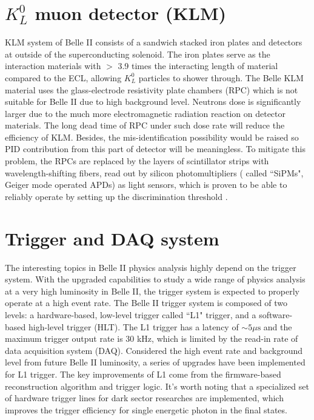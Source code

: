 \section{$K_L^0$ muon detector (KLM)}
KLM system of Belle II consists of a sandwich stacked iron plates and detectors at outside of the superconducting solenoid. The iron plates serve as the interaction materials with $>$ 3.9 times the interacting length of material compared to the ECL, allowing $K_L^0$ particles to shower through.
The Belle KLM material uses the glass-electrode resistivity plate chambers (RPC) which is not suitable for Belle II due to high background level.  Neutrons dose is significantly larger due to the much more electromagnetic radiation reaction on detector materials. The long dead time of RPC under such dose rate will reduce the efficiency of KLM. Besides, the mis-identification possibility would be raised so PID contribution from this part of detector will be meaningless. To mitigate this problem, the RPCs are replaced by the layers of scintillator strips with wavelength-shifting ﬁbers, read out by silicon photomultipliers ( called ``SiPMs", Geiger mode operated APDs) as light sensors, which is proven to be able to reliably operate by setting up the discrimination threshold \cite{b2book}.

\begin{comment}
\begin{figure}[htbp]
\centering
\texttt{[image: RPC]}
\caption{ RPC layers structure\cite{b2book}}
\end{figure}
\end{comment}



\section{Trigger and DAQ system}
The interesting topics in Belle II physics analysis highly depend on the trigger system. With the upgraded capabilities to study a wide range of physics analysis at a very high luminosity in Belle II, the trigger system is expected to properly operate at a high event rate. The Belle II trigger system is composed of two levels: a hardware-based, low-level trigger called ``L1" trigger, and a software-based high-level trigger (HLT). The L1 trigger has a latency of $\sim 5 \mu\text{s}$ and the maximum trigger output rate is 30 kHz, which is limited by the read-in rate of data acquisition system (DAQ). Considered the high event rate and background level from future Belle II luminosity, a series of upgrades have been implemented for L1 trigger. The key improvements of L1 come from the firmware-based reconstruction algorithm and trigger logic. It's worth noting that a specialized set of hardware trigger lines for dark sector researches are implemented, which improves the trigger efficiency for single energetic photon in the final states. 

